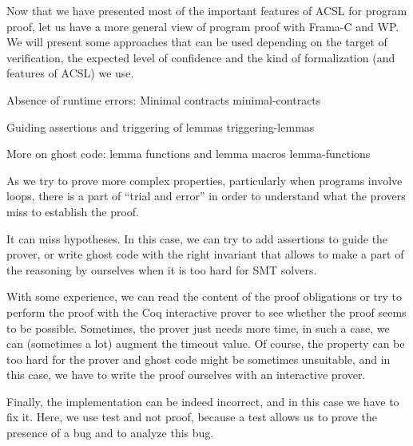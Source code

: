 Now that we have presented most of the important features of ACSL for program
proof, let us have a more general view of program proof with Frama-C and WP. We
will present some approaches that can be used depending on the target of
verification, the expected level of confidence and the kind of formalization
(and features of ACSL) we use.



\begin{levelTwo}
  {Absence of runtime errors: Minimal contracts}
  {minimal-contracts}
\end{levelTwo}

\begin{levelTwo}
  {Guiding assertions and triggering of lemmas}
  {triggering-lemmas}
\end{levelTwo}

\begin{levelTwo}
  {More on ghost code: lemma functions and lemma macros}
  {lemma-functions}
\end{levelTwo}



\horizontalLine
\newpage

As we try to prove more complex properties, particularly when
programs involve loops, there is a part of ``trial and error'' in
order to understand what the provers miss to establish the proof.

It can miss hypotheses. In this case, we can try to add assertions to
guide the prover, or write ghost code with the right invariant that
allows to make a part of the reasoning by ourselves when it is too hard
for SMT solvers.

With some experience, we can read the content of the proof obligations or
try to perform the proof with the Coq interactive prover to see whether
the proof seems to be possible. Sometimes, the prover just needs more
time, in such a case, we can (sometimes a lot) augment the timeout value.
Of course, the property can be too hard for the prover and ghost code
might be sometimes unsuitable, and in this case, we have to write the
proof ourselves with an interactive prover.

Finally, the implementation can be indeed incorrect, and in this case we
have to fix it. Here, we use test and not proof, because a test
allows us to prove the presence of a bug and to analyze this bug.
